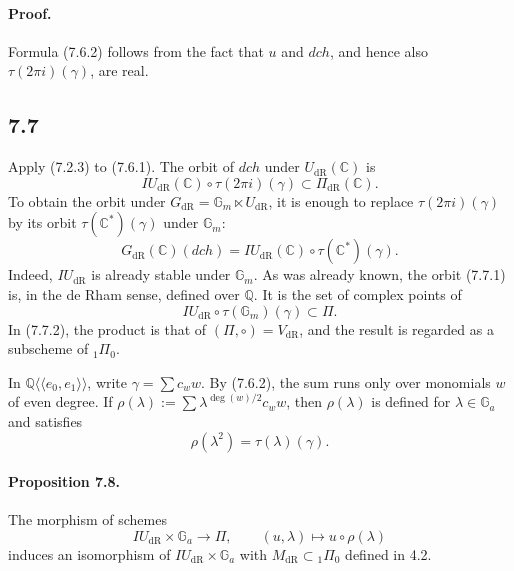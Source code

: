 \documentclass[10pt]{article}
\newcommand{\Q}{\mathbb Q}
\newcommand{\C}{\mathbb C}
\newcommand{\Gm}{\mathbb G_m}
\newcommand{\Ga}{\mathbb G_a}
\newcommand{\dR}{\mathrm{dR}}
\begin{document}
\paragraph{Proof.}
Formula (7.6.2) follows from the fact that $u$ and $dch$, and hence also $\tau(2\pi i)(\gamma)$, are real.

\subsection*{7.7}
Apply (7.2.3) to (7.6.1). The orbit of $dch$ under $U_{\dR}(\C)$ is
\[
IU_{\dR}(\C)\circ\tau(2\pi i)(\gamma)\subset\Pi_{\dR}(\C).
\]
To obtain the orbit under $G_{\dR}=\Gm\ltimes U_{\dR}$, it is enough to replace $\tau(2\pi i)(\gamma)$ by its orbit $\tau(\C^*)(\gamma)$ under $\Gm$:
\begin{equation}
G_{\dR}(\C)(dch)=IU_{\dR}(\C)\circ\tau(\C^*)(\gamma).
\tag{7.7.1}
\end{equation}
Indeed, $IU_{\dR}$ is already stable under $\Gm$. As was already known, the orbit (7.7.1) is, in the de Rham sense, defined over $\Q$. It is the set of complex points of
\begin{equation}
IU_{\dR}\circ\tau(\Gm)(\gamma)\subset\Pi.
\tag{7.7.2}
\end{equation}
In (7.7.2), the product is that of $(\Pi,\circ)=V_{\dR}$, and the result is regarded as a subscheme of ${}_1\Pi_0$.

In $\Q\langle\!\langle e_0,e_1\rangle\!\rangle$, write $\gamma=\sum c_w w$. By (7.6.2), the sum runs only over monomials $w$ of even degree. If $\rho(\lambda):=\sum \lambda^{\deg(w)/2}c_w w$, then $\rho(\lambda)$ is defined for $\lambda\in\Ga$ and satisfies
\begin{equation}
\rho(\lambda^2)=\tau(\lambda)(\gamma).
\tag{7.7.3}
\end{equation}

\paragraph{Proposition 7.8.}
The morphism of schemes
\begin{equation}
IU_{\dR}\times\Ga\longrightarrow\Pi,
\qquad (u,\lambda)\longmapsto u\circ\rho(\lambda)
\tag{7.8.1}
\end{equation}
induces an isomorphism of $IU_{\dR}\times\Ga$ with $M_{\dR}\subset{}_1\Pi_0$ defined in 4.2.
\end{document}
